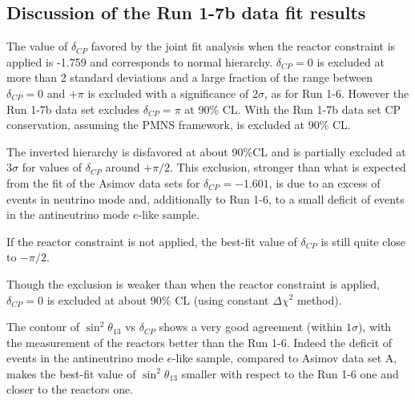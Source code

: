 %
%

\subsection {Discussion of the Run 1-7b data fit results}
\label{sec:results_discussion_run17b}

The value of $\delta_{CP}$ favored by the joint fit analysis when the reactor constraint is applied 
is -1.759 and corresponds to normal hierarchy.
$\delta_{CP} = 0$ is excluded at more than 2 standard deviations and a large fraction of the range between $\delta_{CP} = 0$ and $+\pi$
is excluded with a significance of $2 \sigma$, as for Run 1-6.
However the Run 1-7b data set excludes $\delta_{CP} = \pi$ at 90\% CL.
With the Run 1-7b data set CP conservation, assuming the PMNS framework, is excluded at 90\% CL. 

The inverted hierarchy is disfavored at about 90\%CL and is partially 
excluded at $3\sigma$ for values of $\delta_{CP}$ around $+\pi/2$.
This exclusion, stronger than what is expected from the fit of the Asimov data sets for $\delta_{CP}=-1.601$,
is due to an excess of events in neutrino mode and, additionally to Run 1-6, 
to a small deficit of events in the antineutrino mode $e$-like sample.

If the reactor constraint is not applied, the best-fit value of $\delta_{CP}$ is still quite close to $-\pi/2$.

Though the exclusion is weaker than when the reactor constraint is applied,
$\delta_{CP}=0$ is excluded at about 90\% CL (using constant $\Delta \chi^2$ method).

The contour of $\sin^2 \theta_{13}$ vs $\delta_{CP}$ shows a very good agreement (within $1 \sigma$),
with the measurement of the reactors better than the Run 1-6.
Indeed the deficit of events in the antineutrino mode $e$-like sample, compared to Asimov data set A,
makes the best-fit value of $\sin^2 \theta_{13}$ smaller with respect to the Run 1-6 one and closer to the reactors one.


\clearpage




